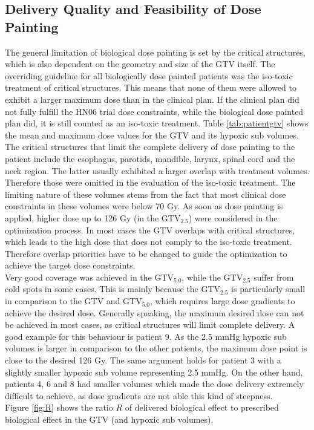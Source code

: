 \subsection{Delivery Quality and Feasibility of Dose Painting}The general limitation of biological dose painting is set by the critical structures, which is also dependent on the geometry and size of the GTV itself. The overriding guideline for all biologically dose painted patients was the iso-toxic treatment of critical structures. This means that none of them were allowed to exhibit a larger maximum dose than in the clinical plan. If the clinical plan did not fully fulfill the HN06 trial dose constraints, while the biological dose painted plan did, it is still counted as an iso-toxic treatment. Table \ref{tab:patientgtv} shows the mean and maximum dose values for the GTV and its hypoxic sub volumes. The critical structures that limit the complete delivery of dose painting to the patient include the esophagus, parotids, mandible, larynx, spinal cord and the neck region. The latter usually exhibited a larger overlap with treatment volumes. Therefore those were omitted in the evaluation of the iso-toxic treatment. The limiting nature of these volumes stems from the fact that most clinical dose constraints in these volumes were below 70 Gy. As soon as dose painting is applied, higher dose up to 126 Gy (in the GTV$_{2.5}$) were considered in the optimization process. In most cases the GTV overlaps with critical structures, which leads to the high dose that does not comply to the iso-toxic treatment. Therefore overlap priorities have to be changed to guide the optimization to achieve the target dose constraints.\\Very good coverage was achieved in the GTV$_{5.0}$, while the GTV$_{2.5}$ suffer from cold spots in some cases. This is mainly because the GTV$_{2.5}$ is particularly small in comparison to the GTV and GTV$_{5.0}$, which requires large dose gradients to achieve the desired dose. Generally speaking, the maximum desired dose can not be achieved in most cases, as critical structures will limit complete delivery. A good example for this behaviour is patient 9. As the 2.5 mmHg hypoxic sub volumes is larger in comparison to the other patients, the maximum dose point is close to the desired 126 Gy. The same argument holds for patient 3 with a slightly smaller hypoxic sub volume representing 2.5 mmHg. On the other hand, patients 4, 6 and 8 had smaller volumes which made the dose delivery extremely difficult to achieve, as dose gradients are not able this kind of steepness. \\Figure \ref{fig:R} shows the ratio $R$ of delivered biological effect to prescribed biological effect in the GTV (and hypoxic sub volumes). 
